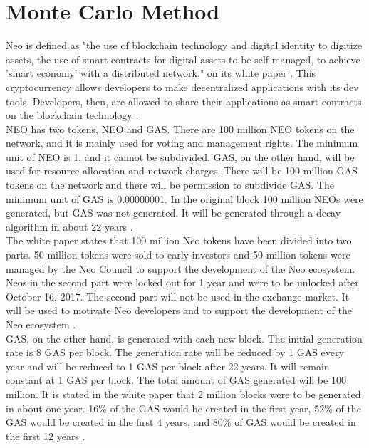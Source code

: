 \documentclass[12pt, a4paper]{article}
\begin{document}
\section{Monte Carlo Method}
Neo is defined as "the use of blockchain technology and digital identity to digitize assets, the use of smart contracts for digital assets to be self-managed, to achieve 'smart economy' with a distributed network." on its white paper \cite{2}.  This cryptocurrency allows developers to make decentralized applications with its dev tools.  Developers, then, are allowed to share their applications as smart contracts on the blockchain technology \cite{3}.\\[\baselineskip]
NEO has two tokens, NEO and GAS.  There are 100 million NEO tokens on the network, and it is mainly used for voting and management rights.  The minimum unit of NEO is 1, and it cannot be subdivided.  GAS, on the other hand, will be used for resource allocation and network charges.  There will be 100 million GAS tokens on the network and there will be permission to subdivide GAS.  The minimum unit of GAS is 0.00000001.  In the original block 100 million NEOs were generated, but GAS was not generated.  It will be generated through a decay algorithm in about 22 years \cite{2}.\\[\baselineskip]
The white paper states that 100 million Neo tokens have been divided into two parts.  50 million tokens were sold to early investors and 50 million tokens were managed by the Neo Council to support the development of the Neo ecosystem.  Neos in the second part were locked out for 1 year and were to be unlocked after October 16, 2017.  The second part will not be used in the exchange market.  It will be used to motivate Neo developers and to support the development of the Neo ecosystem \cite{2}.\\[\baselineskip]
GAS, on the other hand, is generated with each new block.  The initial generation rate is 8 GAS per block.  The generation rate will be reduced by 1 GAS every year and will be reduced to 1 GAS per block after 22 years.  It will remain constant at 1 GAS per block.  The total amount of GAS generated will be 100 million.  It is stated in the white paper that 2 million blocks were to be generated in about one year.  16\% of the GAS would be created in the first year, 52\% of the GAS would be created in the first 4 years, and 80\% of GAS would be created in the first 12 years \cite{2}.\\[\baselineskip]
\end{document}
